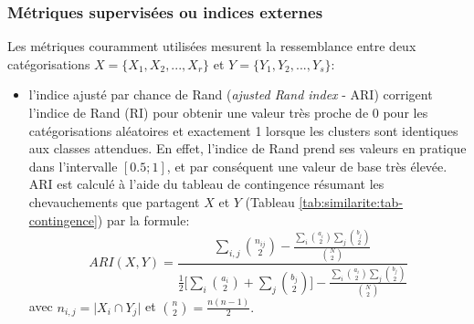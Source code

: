 \subsubsection{Métriques supervisées ou indices externes}
\label{sec:similarite:biblio:supeval}
Les métriques couramment utilisées mesurent la ressemblance entre deux catégorisations $X = \lbrace X_1, X_2,..., X_r \rbrace$ et $Y = \lbrace Y_1,Y_2,..., Y_s \rbrace$:
\begin{itemize}
	\item l'indice ajusté par chance de Rand (\textit{ajusted Rand index} - ARI) \citep{hubert1985adjustedrandidx} corrigent l'indice de Rand (RI) \citep{rand1971randidx} pour obtenir une valeur très proche de 0 pour les catégorisations aléatoires et exactement 1 lorsque les clusters sont identiques aux classes attendues. En effet, l'indice de Rand prend ses valeurs en pratique dans l'intervalle $[0.5;1]$, et par conséquent une valeur de base très élevée. ARI est calculé à l'aide du tableau de contingence résumant les chevauchements que partagent $X$ et $Y$ (Tableau \ref{tab:similarite:tab-contingence}) par la formule: %
	{\footnotesize\[ARI(X,Y) = \frac{\sum\limits_{i,j}\binom{n_{ij}}{2} - \frac{\sum\limits_{i}\binom{a_{i}}{2}\sum\limits_{j}\binom{b_{j}}{2}}{\binom{N}{2}}}{\frac{1}{2}\big[\sum\limits_{i}\binom{a_{i}}{2}+\sum\limits_{j}\binom{b_{j}}{2}\big] - \frac{\sum\limits_{i}\binom{a_{i}}{2}\sum\limits_{j}\binom{b_{j}}{2}}{\binom{N}{2}}}\]} avec  $n_{i,j} = \vert X_i \cap Y_j\vert$ et $\binom{n}{2} = \frac{n(n-1)}{2}.$
	

\end{itemize}
